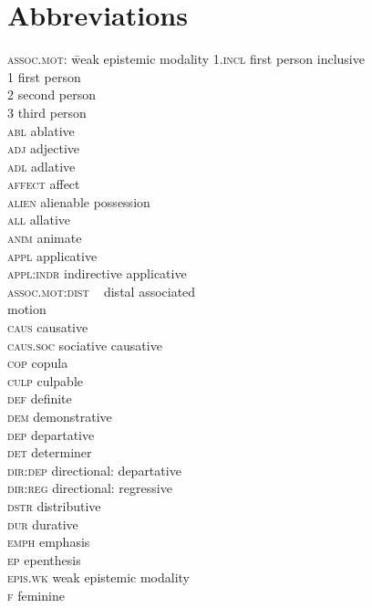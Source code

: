 \documentclass[output=paper]{LSP/langsci}
\begin{document}
\section*{Abbreviations}
\begin{multicols}{2}
\begin{tabbing}
\textsc{assoc.mot:} \=  weak epistemic modality \kill
\textsc{1.incl} \>  first person inclusive\\
1 \>  first person\\
2 \>  second person\\
3 \>  third person\\
\textsc{abl} \>  ablative\\
\textsc{adj} \>  adjective\\
\textsc{adl} \>  adlative\\
\textsc{affect} \>  affect\\
\textsc{alien} \>  alienable possession\\
\textsc{all} \>  allative\\
\textsc{anim} \>  animate\\
\textsc{appl} \>  applicative\\
\textsc{appl:indr}  \>  indirective applicative\\
\textsc{assoc.mot:dist} ~ distal associated\\
            \>  motion\\
\textsc{caus} \>  causative\\
\textsc{caus.soc}  \>  sociative causative\\
\textsc{cop} \>  copula\\
\textsc{culp} \>  culpable\\
\textsc{def} \>  definite\\
\textsc{dem} \>  demonstrative\\
\textsc{dep} \>  departative\\
\textsc{det} \>  determiner\\
\textsc{dir:dep} \>   directional: departative\\
\textsc{dir:reg} \>   directional: regressive\\
\textsc{dstr} \>  distributive\\
\textsc{dur} \>  durative\\
\textsc{emph} \>  emphasis\\
\textsc{ep} \>  epenthesis\\
\textsc{epis.wk}  \>  weak epistemic modality\\
\textsc{f} \>  feminine\\

\end{tabbing}
\end{multicols}
\end{document}
